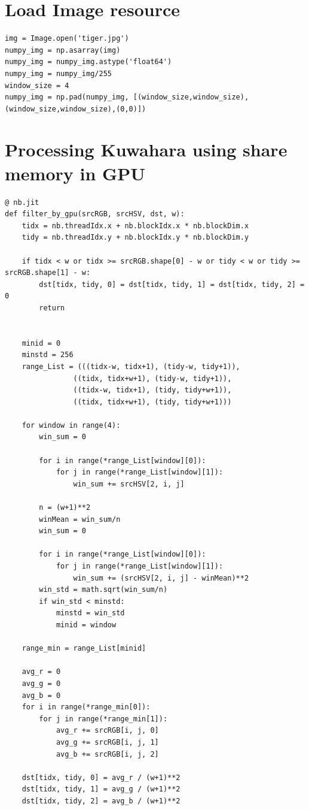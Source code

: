 \documentclass{article}
\begin{document}
\section{Load Image resource}
\begin{verbatim}
img = Image.open('tiger.jpg')
numpy_img = np.asarray(img)
numpy_img = numpy_img.astype('float64')
numpy_img = numpy_img/255
window_size = 4
numpy_img = np.pad(numpy_img, [(window_size,window_size),(window_size,window_size),(0,0)])
\end{verbatim}

\section{Processing Kuwahara using share memory in GPU}
\begin{verbatim}
@ nb.jit
def filter_by_gpu(srcRGB, srcHSV, dst, w):
    tidx = nb.threadIdx.x + nb.blockIdx.x * nb.blockDim.x
    tidy = nb.threadIdx.y + nb.blockIdx.y * nb.blockDim.y

    if tidx < w or tidx >= srcRGB.shape[0] - w or tidy < w or tidy >= srcRGB.shape[1] - w:
        dst[tidx, tidy, 0] = dst[tidx, tidy, 1] = dst[tidx, tidy, 2] = 0
        return


    minid = 0
    minstd = 256
    range_List = (((tidx-w, tidx+1), (tidy-w, tidy+1)),
                ((tidx, tidx+w+1), (tidy-w, tidy+1)),
                ((tidx-w, tidx+1), (tidy, tidy+w+1)),
                ((tidx, tidx+w+1), (tidy, tidy+w+1)))

    for window in range(4):
        win_sum = 0

        for i in range(*range_List[window][0]):
            for j in range(*range_List[window][1]):
                win_sum += srcHSV[2, i, j]

        n = (w+1)**2
        winMean = win_sum/n
        win_sum = 0

        for i in range(*range_List[window][0]):
            for j in range(*range_List[window][1]):
                win_sum += (srcHSV[2, i, j] - winMean)**2
        win_std = math.sqrt(win_sum/n)
        if win_std < minstd:
            minstd = win_std
            minid = window

    range_min = range_List[minid]

    avg_r = 0
    avg_g = 0
    avg_b = 0
    for i in range(*range_min[0]):
        for j in range(*range_min[1]):
            avg_r += srcRGB[i, j, 0]
            avg_g += srcRGB[i, j, 1]
            avg_b += srcRGB[i, j, 2]

    dst[tidx, tidy, 0] = avg_r / (w+1)**2
    dst[tidx, tidy, 1] = avg_g / (w+1)**2
    dst[tidx, tidy, 2] = avg_b / (w+1)**2
\end{verbatim}
\end{document}
